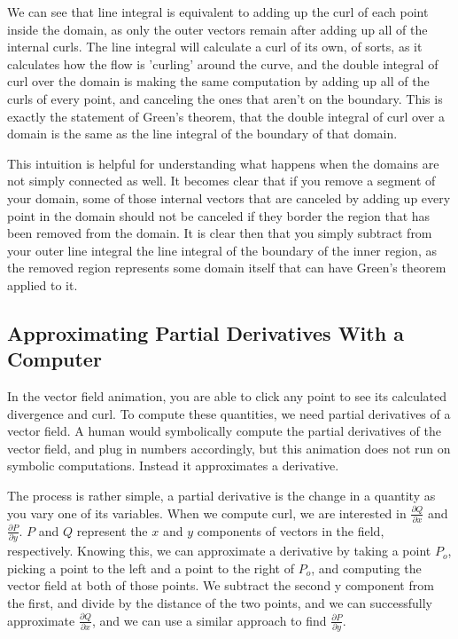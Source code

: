 \documentclass{article}
\begin{document}
    We can see that line integral is equivalent to adding up the curl of each point inside the domain,
    as only the outer vectors remain after adding up all of the internal curls.
    The line integral will calculate a curl of its own, of sorts, as it calculates how the flow is 'curling' around the curve, and the double integral of curl over the domain is making the same computation by adding up all of the curls of every point, and canceling the ones that aren't on the boundary.
    This is exactly the statement of Green's theorem, that the double integral of curl over a domain is the same as the line integral of the boundary of that domain.

    This intuition is helpful for understanding what happens when the domains are not simply connected as well.
    It becomes clear that if you remove a segment of your domain, some of those internal vectors that are canceled by adding up every point in the domain should not be canceled if they border the region that has been removed from the domain.
    It is clear then that you simply subtract from your outer line integral the line integral of the boundary of the inner region, as the removed region represents some domain itself that can have Green's theorem applied to it.

    \subsection*{Approximating Partial Derivatives With a Computer}
    In the vector field animation, you are able to click any point to see its calculated divergence and curl.
    To compute these quantities, we need partial derivatives of a vector field.
    A human would symbolically compute the partial derivatives of the vector field, and plug in numbers accordingly, but this animation does not run on symbolic computations.
    Instead it approximates a derivative.

    The process is rather simple, a partial derivative is the change in a quantity as you vary one of its variables.
    When we compute curl, we are interested in $\frac{\partial Q}{\partial x}$ and $\frac{\partial P}{\partial y}$.
    $P$ and $Q$ represent the $x$ and $y$ components of vectors in the field, respectively.
    Knowing this, we can approximate a derivative by taking a point $P_o$, picking a point to the left and a point to the right of $P_o$, and computing the vector field at both of those points.
    We subtract the second y component from the first, and divide by the distance of the two points, and we can successfully approximate $\frac{\partial Q}{\partial x}$, and we can use a similar approach to find $\frac{\partial P}{\partial y}$.
\end{document}
